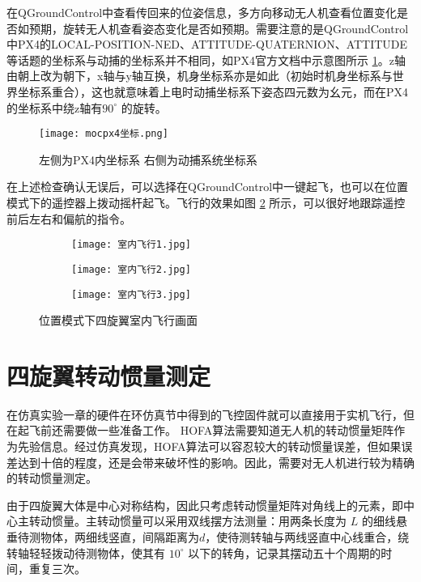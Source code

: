 在QGroundControl中查看传回来的位姿信息，多方向移动无人机查看位置变化是否如预期，旋转无人机查看姿态变化是否如预期。需要注意的是QGroundControl中PX4的LOCAL-POSITION-NED、ATTITUDE-QUATERNION、ATTITUDE等话题的坐标系与动捕的坐标系并不相同，如PX4官方文档\cite{px4}中示意图所示 \ref{mocpx4}。z轴由朝上改为朝下，x轴与y轴互换，机身坐标系亦是如此（初始时机身坐标系与世界坐标系重合），这也就意味着上电时动捕坐标系下姿态四元数为幺元，而在PX4的坐标系中绕z轴有$90  ^{\circ}$ 的旋转。
\begin{figure}[!h]
  \centering
  \texttt{[image: mocpx4坐标.png]}
  \caption{左侧为PX4内坐标系 右侧为动捕系统坐标系\protect\footnotemark[1]}
  \label{mocpx4}
\end{figure}
在上述检查确认无误后，可以选择在QGroundControl中一键起飞，也可以在位置模式下的遥控器上拨动摇杆起飞。飞行的效果如图 \ref{室内飞行} 所示，可以很好地跟踪遥控前后左右和偏航的指令。
\begin{figure}[h]
  \centering
  \begin{subfigure}[c]{0.33\textwidth}
    \centering
    \texttt{[image: 室内飞行1.jpg]}
  \end{subfigure} \hfill
  \begin{subfigure}[c]{0.33\textwidth}
    \centering
    \texttt{[image: 室内飞行2.jpg]}
  \end{subfigure}\hfill
    \begin{subfigure}[c]{0.33\textwidth}
      \centering
      \texttt{[image: 室内飞行3.jpg]}
  \end{subfigure}
  \caption{位置模式下四旋翼室内飞行画面}
  \label{室内飞行}
  \end{figure}
\newpage
  \section{四旋翼转动惯量测定}
  在仿真实验一章的硬件在环仿真节中得到的飞控固件就可以直接用于实机飞行，但在起飞前还需要做一些准备工作。
  HOFA算法需要知道无人机的转动惯量矩阵作为先验信息。经过仿真发现，HOFA算法可以容忍较大的转动惯量误差，但如果误差达到十倍的程度，还是会带来破坏性的影响。因此，需要对无人机进行较为精确的转动惯量测定。

  由于四旋翼大体是中心对称结构，因此只考虑转动惯量矩阵对角线上的元素，即中心主转动惯量。主转动惯量可以采用双线摆方法测量\cite{转动惯量}：用两条长度为 $L$ 的细线悬垂待测物体，两细线竖直，间隔距离为$d$，使待测转轴与两线竖直中心线重合，绕转轴轻轻拨动待测物体，使其有 $10 ^\circ$ 以下的转角，记录其摆动五十个周期的时间，重复三次。

